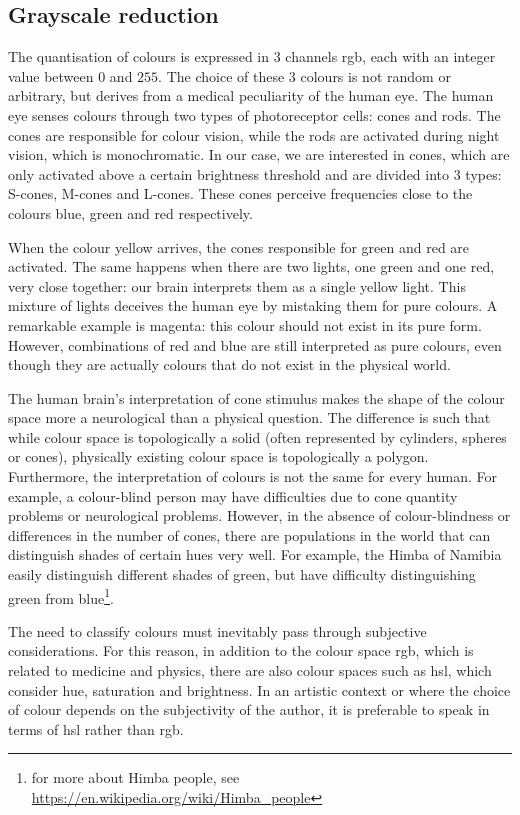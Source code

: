 \subsection{Grayscale reduction}
\begin{toReview}
The quantisation of colours is expressed in $3$ channels \gls{rgb}, each with an integer value between $0$ and $255$. The choice of these $3$ colours is not random or arbitrary, but derives from a medical peculiarity of the human eye. The human eye senses colours through two types of photoreceptor cells: cones and rods. The cones are responsible for colour vision, while the rods are activated during night vision, which is monochromatic. In our case, we are interested in cones, which are only activated above a certain brightness threshold and are divided into $3$ types: S-cones, M-cones and L-cones. These cones perceive frequencies close to the colours blue, green and red respectively.

\noindent When the colour yellow arrives, the cones responsible for green and red are activated. The same happens when there are two lights, one green and one red, very close together: our brain interprets them as a single yellow light. This mixture of lights deceives the human eye by mistaking them for pure colours. A remarkable example is magenta: this colour should not exist in its pure form. However, combinations of red and blue are still interpreted as pure colours, even though they are actually colours that do not exist in the physical world.

\noindent The human brain's interpretation of cone stimulus makes the shape of the colour space more a neurological than a physical question. The difference is such that while colour space is topologically a solid (often represented by cylinders, spheres or cones), physically existing colour space is topologically a polygon. Furthermore, the interpretation of colours is not the same for every human. For example, a colour-blind person may have difficulties due to cone quantity problems or neurological problems. However, in the absence of colour-blindness or differences in the number of cones, there are populations in the world that can distinguish shades of certain hues very well. For example, the Himba of Namibia easily distinguish different shades of green, but have difficulty distinguishing green from blue\footnote{for more about Himba people, see \url{https://en.wikipedia.org/wiki/Himba_people}}.

\noindent The need to classify colours must inevitably pass through subjective considerations. For this reason, in addition to the colour space \gls{rgb}, which is related to medicine and physics, there are also colour spaces such as \gls{hsl}, which consider hue, saturation and brightness. In an artistic context or where the choice of colour depends on the subjectivity of the author, it is preferable to speak in terms of \gls{hsl} rather than \gls{rgb}.


\end{toReview}
